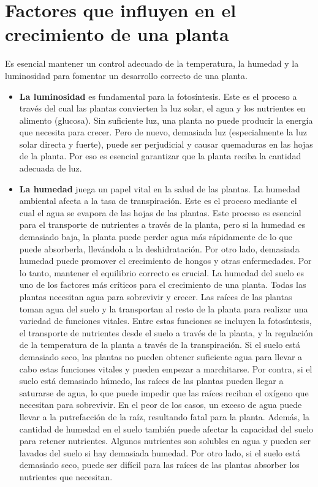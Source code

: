 \section{Factores que influyen en el crecimiento de una planta}
Es esencial mantener un control adecuado de la temperatura, la humedad y la luminosidad para fomentar un desarrollo correcto de una planta. \cite{wiki:factores_crecimiento_planta}
\begin{itemize}
    \item \textbf{La luminosidad} es fundamental para la fotosíntesis. Este es el proceso a través del cual las plantas convierten la luz solar, el agua y los nutrientes en alimento (glucosa). Sin suficiente luz, una planta no puede producir la energía que necesita para crecer. Pero de nuevo, demasiada luz (especialmente la luz solar directa y fuerte), puede ser perjudicial y causar quemaduras en las hojas de la planta. Por eso es esencial garantizar que la planta reciba la cantidad adecuada de luz.
    \item \textbf{La humedad} juega un papel vital en la salud de las plantas. La humedad ambiental afecta a la tasa de transpiración. Este es el proceso mediante el cual el agua se evapora de las hojas de las plantas. Este proceso es esencial para el transporte de nutrientes a través de la planta, pero si la humedad es demasiado baja, la planta puede perder agua más rápidamente de lo que puede absorberla, llevándola a la deshidratación. Por otro lado, demasiada humedad puede promover el crecimiento de hongos y otras enfermedades. Por lo tanto, mantener el equilibrio correcto es crucial. La humedad del suelo es uno de los factores más críticos para el crecimiento de una planta. Todas las plantas necesitan agua para sobrevivir y crecer. Las raíces de las plantas toman agua del suelo y la transportan al resto de la planta para realizar una variedad de funciones vitales. Entre estas funciones se incluyen la fotosíntesis, el transporte de nutrientes desde el suelo a través de la planta, y la regulación de la temperatura de la planta a través de la transpiración. Si el suelo está demasiado seco, las plantas no pueden obtener suficiente agua para llevar a cabo estas funciones vitales y pueden empezar a marchitarse. Por contra, si el suelo está demasiado húmedo, las raíces de las plantas pueden llegar a saturarse de agua, lo que puede impedir que las raíces reciban el oxígeno que necesitan para sobrevivir. En el peor de los casos, un exceso de agua puede llevar a la putrefacción de la raíz, resultando fatal para la planta. Además, la cantidad de humedad en el suelo también puede afectar la capacidad del suelo para retener nutrientes. Algunos nutrientes son solubles en agua y pueden ser lavados del suelo si hay demasiada humedad. Por otro lado, si el suelo está demasiado seco, puede ser difícil para las raíces de las plantas absorber los nutrientes que necesitan.

\end{itemize}
